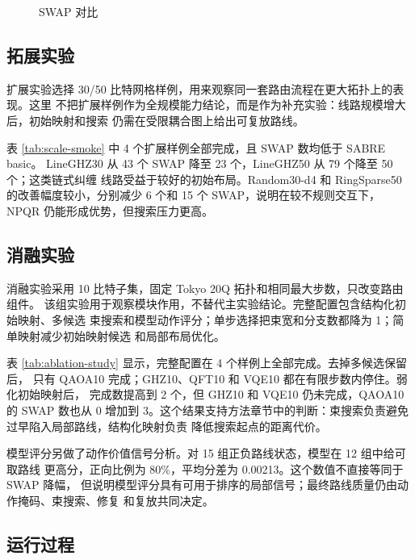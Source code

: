 \begin{figure}[H]
  \centering
  
  \caption{SWAP 对比}
  \label{fig:swap-comparison}
\end{figure}

\subsection{拓展实验}

扩展实验选择 30/50 比特网格样例，用来观察同一套路由流程在更大拓扑上的表现。这里
不把扩展样例作为全规模能力结论，而是作为补充实验：线路规模增大后，初始映射和搜索
仍需在受限耦合图上给出可复放路线。



表 \ref{tab:scale-smoke} 中 4 个扩展样例全部完成，且 SWAP 数均低于 SABRE basic。
LineGHZ30 从 43 个 SWAP 降至 23 个，LineGHZ50 从 79 个降至 50 个；这类链式纠缠
线路受益于较好的初始布局。Random30-d4 和 RingSparse50 的改善幅度较小，分别减少
6 个和 15 个 SWAP，说明在较不规则交互下，NPQR 仍能形成优势，但搜索压力更高。

\subsection{消融实验}

消融实验采用 10 比特子集，固定 Tokyo 20Q 拓扑和相同最大步数，只改变路由组件。
该组实验用于观察模块作用，不替代主实验结论。完整配置包含结构化初始映射、多候选
束搜索和模型动作评分；单步选择把束宽和分支数都降为 1；简单映射减少初始映射候选
和局部布局优化。



表 \ref{tab:ablation-study} 显示，完整配置在 4 个样例上全部完成。去掉多候选保留后，
只有 QAOA10 完成；GHZ10、QFT10 和 VQE10 都在有限步数内停住。弱化初始映射后，
完成数提高到 2 个，但 GHZ10 和 VQE10 仍未完成，QAOA10 的 SWAP 数也从 0 增加到
3。这个结果支持方法章节中的判断：束搜索负责避免过早陷入局部路线，结构化映射负责
降低搜索起点的距离代价。

模型评分另做了动作价值信号分析。对 15 组正负路线状态，模型在 12 组中给可取路线
更高分，正向比例为 80\%，平均分差为 0.00213。这个数值不直接等同于 SWAP 降幅，
但说明模型评分具有可用于排序的局部信号；最终路线质量仍由动作掩码、束搜索、修复
和复放共同决定。

\subsection{运行过程}

